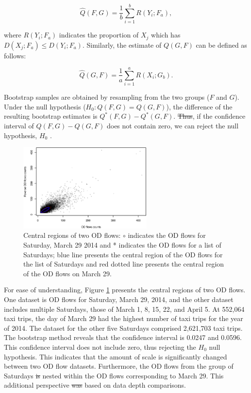 \documentclass[a4paper,UKenglish]{lipics-v2018}
\providecommand{\DIFadd}[1]{{\protect\color{blue}\uwave{#1}}} %
\providecommand{\DIFdel}[1]{{\protect\color{red}\sout{#1}}}                      %
\providecommand{\DIFaddbegin}{} %
\providecommand{\DIFaddend}{} %
\providecommand{\DIFdelbegin}{} %
\providecommand{\DIFdelend}{} %
\begin{document}
\begin{equation*}
\hat{Q}(F,G) =\frac{1}{b} \sum_{i=1}^{b} R(Y_i;F_a),
\end{equation*}

where $R(Y_i;F_a)$ indicates the proportion of $X_j$ which has $D(X_j;F_a) \leq D(Y_i;F_a)$.
Similarly, the estimate of $Q(G,F)$ can be defined as follows:

\begin{equation*}
\hat{Q}(G,F) =\frac{1}{a} \sum_{i=1}^{a} R(X_i;G_b).
\end{equation*}

Bootstrap samples are obtained by resampling from the two groups ($F$ and $G$).
Under the null hypothesis ($H_0: Q(F,G) = Q(G,F)$), the difference of the resulting bootstrap estimates is $Q^*(F,G) - Q^*(G,F)$.
\DIFdelbegin \DIFdel{Thus}\DIFdelend \DIFaddbegin \DIFadd{Therefore}\DIFaddend , if the confidence interval of $Q(F,G) - Q(G,F)$ does not contain zero, we can reject the null hypothesis, $H_0$ \cite{liu93JASA,wilcox03MBR}.

\begin{figure}
	\centering
	\includegraphics[width=0.6\textwidth]{images/com_mar_0329.eps}
	\caption{Central regions of two OD flows: $\circ$ indicates the OD flows for Saturday, March 29 2014 and * indicates the OD flows for a list of Saturdays; blue line presents the central region of the OD flows for the list of Saturdays and red dotted line presents the central region of the OD flows on March 29.}
	\label{fig:com_mar_0329}	
\end{figure}

For \DIFaddbegin \DIFadd{the }\DIFaddend ease of understanding, Figure \ref{fig:com_mar_0329} presents the central regions of two OD flows.
One dataset is OD flows for Saturday, March 29, 2014, and the other dataset includes multiple Saturdays, those of March 1, 8, 15, 22, and April 5.
At 552,064 taxi trips, the day of March 29 had the highest number of taxi trips for the year of 2014.
The dataset for the other five Saturdays comprised 2,621,703 taxi trips.
The bootstrap method reveals that the confidence interval is 0.0247 and 0.0596.
This confidence interval does not include zero, thus rejecting the $H_0$ null hypothesis.
This indicates that the amount of scale is significantly changed between two OD flow datasets.
Furthermore, the OD flows from the group of Saturdays \DIFdelbegin \DIFdel{is }\DIFdelend \DIFaddbegin \DIFadd{are }\DIFaddend nested within the OD flows corresponding to March 29. This additional perspective \DIFdelbegin \DIFdel{was }\DIFdelend \DIFaddbegin \DIFadd{is }\DIFaddend based on data depth comparisons. 
\end{document}
